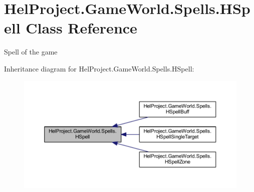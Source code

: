 \hypertarget{class_hel_project_1_1_game_world_1_1_spells_1_1_h_spell}{}\section{Hel\+Project.\+Game\+World.\+Spells.\+H\+Spell Class Reference}
\label{class_hel_project_1_1_game_world_1_1_spells_1_1_h_spell}


Spell of the game  




Inheritance diagram for Hel\+Project.\+Game\+World.\+Spells.\+H\+Spell\+:\nopagebreak
\begin{figure}[H]
\begin{center}
\leavevmode
\includegraphics[width=350pt]{class_hel_project_1_1_game_world_1_1_spells_1_1_h_spell__inherit__graph}
\end{center}
\end{figure}
